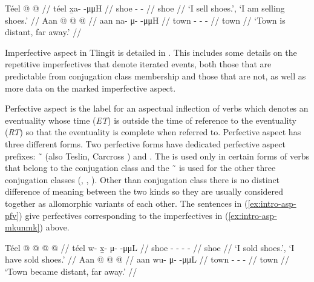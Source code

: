 \documentclass[12pt,letterpaper,oneside,article]{memoir}
\begin{document}
\pex\label{ex:intro-asp-mkunmk}%
\a\label{ex:intro-asp-mkunmk-unmk}%
%
\begingl
	\gla	Téel  @ {} @ {} //
	\glb	téel x̱a-  -μμH //
	\glc	shoe -  - //
	\gld	shoe  {} {} //
	\glft	‘I sell shoes.’, ‘I am selling shoes.’
		//
\endgl
\a\label{ex:intro-asp-mkunmk-mk}%
%
\begingl
	\gla	Aan  @ {} @ {} @ {} //
	\glb	aan na- μ-  -μμH //
	\glc	town - -  - //
	\gld	town  {} {} {} //
	\glft	‘Town is distant, far away.’
		//
\endgl
\xe

Imperfective aspect in Tlingit is detailed in \cite[ch.\ 6 §2.1]{crippen:2019}.
This includes some details on the repetitive imperfectives that denote iterated events, both those that are predictable from conjugation class membership and those that are not, as well as more data on the marked imperfective aspect.

Perfective aspect is the label for an aspectual inflection of verbs which denotes an eventuality whose time (\textit{ET}) is outside the time of reference to the eventuality (\textit{RT}) so that the eventuality is complete when referred to.
Perfective aspect has three different forms.
Two perfective forms have dedicated perfective aspect prefixes:  \~\  (also Teslin, Carcross ) and .
The  is used only in certain forms of verbs that belong to the  conjugation class and the  \~\  is used for the other three conjugation classes (, , ).
Other than conjugation class there is no distinct difference of meaning between the two kinds so they are usually considered together as allomorphic variants of each other.
The sentences in (\ref{ex:intro-asp-pfv}) give perfectives corresponding to the imperfectives in (\ref{ex:intro-asp-mkunmk}) above.

\pex\label{ex:intro-asp-pfv}%
\a\label{ex:intro-asp-pfv-act}%
%
\begingl
	\gla	Téel  @ {} @ {} @ {} @ {} //
	\glb	téel w- x̱- μ-  -μμL //
	\glc	shoe - - -  - //
	\gld	shoe  {} {} {} {} //
	\glft	‘I sold shoes.’, ‘I have sold shoes.’
		//
\endgl
\a\label{ex:intro-asp-pfv-stv}%
%
\begingl
	\gla	Aan  @ {} @ {} @ {} //
	\glb	aan wu- μ-  -μμL //
	\glc	town - -  - //
	\gld	town  {} {} {} //
	\glft	‘Town became distant, far away.’
		//
\endgl
\xe
\end{document}
